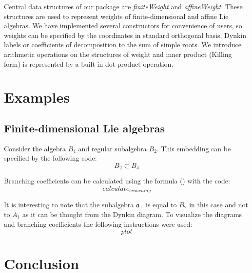 \documentclass[12pt]{article}
\theoremstyle{definition}
\newcommand{\afb}{\mathfrak{a}_{\bot}}
\begin{document}
Central data structures of our package are {\it finiteWeight} and {\it affineWeight}. These structures are used to represent weights of finite-dimensional and affine Lie algebras. We have implemented several constructors for convenience of users, so weights can be specified by the coordinates in standard orthogonal basis, Dynkin labels or coefficients of decomposition to the sum of simple roots. We introduce arithmetic operations on the structures of weight and inner product (Killing form) is represented by a built-in dot-product operation. 


\section{Examples}
\label{sec:examples}

\subsection{Finite-dimensional Lie algebras}
\label{sec:finite-dimens-lie}

Consider the algebra $B_{4}$ and regular subalgebra $B_{2}$. This embedding can be specified by the following code:
\begin{equation}
  \label{eq:1}
  B_{2}\subset B_{4}
\end{equation}

Branching coefficients can be calculated using the formula () with the code:
\begin{equation}
  \label{eq:2}
  calculate_{branching}
\end{equation}

It is interesting to note that the subalgebra $\afb$ is equal to $B_{2}$ in this case and not to $A_{1}$ as it can be thought from the Dynkin diagram. To visualize the diagrams and branching coefficients the following instructions were used:
\begin{equation}
  \label{eq:3}
  plot
\end{equation}
\section{Conclusion}
\label{sec:conclusion}



{}

\end{document}
